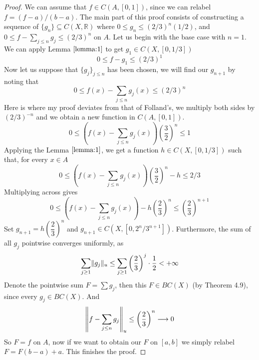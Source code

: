 \documentclass[../../main.tex]{subfiles}
\begin{document}
\begin{proof}
We can assume that $f\in C(A,[0,1])$, since we can relabel $f = (f-a)/(b-a)$. The main part of this proof consists of constructing a sequence of $\{g_n\}\subseteq C(X,\mathbb{R})$ where $0\leq g_n\leq (2/3)^n(1/2)$, and $0\leq f-\sum_{j\leq n}g_j\leq (2/3)^n$ on $A$. Let us begin with the base case with $n=1$. We can apply Lemma $\ref{lemma:1}$ to get $g_1\in C(X,[0,1/3])$
\[
0\leq f-g_1\leq (2/3)^1
\]
Now let us suppose that $\{g_j\}_{j\leq n}$ has been chosen, we will find our $g_{n+1}$ by noting that
\[
0\leq f(x)-\sum_{j\leq n}g_j(x)\leq (2/3)^n
\]
Here is where my proof deviates from that of Folland's, we multiply both sides by $(2/3)^{-n}$ and we obtain a new function in $C(A,[0,1])$.
\[
0\leq \left(f(x)-\sum_{j\leq n}g_j(x)\right)\left(\dfrac{3}{2}\right)^n\leq 1
\]
Applying the Lemma $\ref{lemma:1}$, we get a function $h\in C(X,[0,1/3])$ such that, for every $x\in A$
\[
0\leq \left(f(x)-\sum_{j\leq n}g_j(x)\right)\left(\dfrac{3}{2}\right)^n-h\leq 2/3
\]
Multiplying across gives
\[
0\leq \left(f(x)-\sum_{j\leq n}g_j(x)\right)-h\left(\dfrac{2}{3}\right)^n\leq \left(\dfrac{2}{3}\right)^{n+1}
\]
Set $g_{n+1} = h\left(\dfrac{2}{3}\right)^n$ and $g_{n+1}\in C(X, [0, 2^n/3^{n+1}])$. Furthermore, the sum of all $g_j$ pointwise converges uniformly, as
\[
\sum_{j\geq 1} \lVert {g_j} \rVert_u \leq \sum_{j\geq 1}\left(\dfrac{2}{3}\right)^j\cdot\dfrac{1}{2}<+\infty
\]
Denote the pointwise sum $F = \sum g_j$, then this $F\in BC(X)$ (by Theorem 4.9), since every $g_j\in BC(X)$. And
\[
\left\lVert {f-\sum_{j\leq n}g_j} \right\rVert_u\leq \left(\dfrac{2}{3}\right)^n\longrightarrow 0
\]
So $F= f$ on $A$, now if we want to obtain our $F$ on $[a,b]$ we simply relabel $F = F(b-a) + a$. This finishes the proof.
\end{proof}
\end{document}
